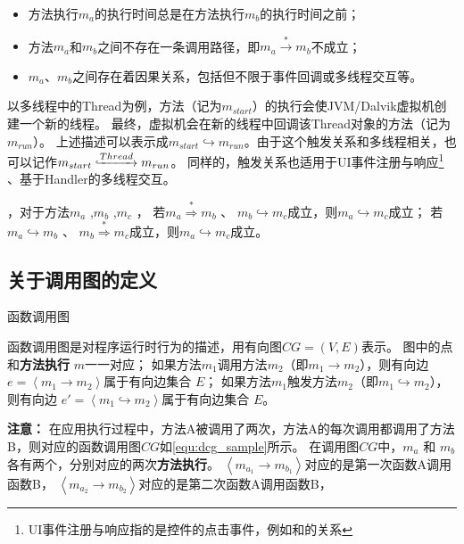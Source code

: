	\begin{itemize}
		\setlength{\itemsep}{-5pt}
		\item  方法执行$m_a$的执行时间总是在方法执行$m_b$的执行时间之前；
		\item 方法$m_a$和$m_b$之间不存在一条调用路径，即$m_a \stackrel{\ast}{\to} m_b $不成立；
		\item $m_a$、$m_b$之间存在着因果关系，包括但不限于事件回调或多线程交互等。
	\end{itemize}


以多线程中的Thread为例，方法（记为$m_{start}$）的执行会使JVM/Dalvik虚拟机创建一个新的线程。
最终，虚拟机会在新的线程中回调该Thread对象的方法（记为$m_{run}$）。
上述描述可以表示成$m_{start} \hookrightarrow m_{run}$。由于这个触发关系和多线程相关，也可以记作$m_{start} \lhook\joinrel\xrightarrow{Thread}  m_{run} $。
同样的，触发关系也适用于UI事件注册与响应\footnote{UI事件注册与响应指的是控件的点击事件，例如和的关系} 、基于Handler的多线程交互。

，对于方法$m_a$ ,$m_b$ ,$m_c$ ，
若$m_a  \stackrel{\ast}{ \Rightarrow } m_b$ 、 $m_b \hookrightarrow m_c$成立，则$m_a \hookrightarrow m_c$成立；
若$m_a  \hookrightarrow m_b$ 、 $m_b \stackrel{\ast}{ \Rightarrow }  m_c$成立，则$m_a \hookrightarrow m_c$成立。

\subsection{关于调用图的定义}

\begin{Def}
	函数调用图%
\end{Def}	


	函数调用图是对程序运行时行为的描述，用有向图$CG = ( V , E)$表示。 图中的点和\textbf{方法执行} $m$一一对应；
	如果方法$m_1$调用方法$m_2$（即$m_1 \to m_2$），则有向边 $e = \left\langle m_1  \to m_2 \right\rangle $属于有向边集合 $E$；
	如果方法$m_1$触发方法$m_2$（即$m_1 \hookrightarrow m_2$），则有向边 $e' = \left\langle m_1  \hookrightarrow m_2 \right\rangle $属于有向边集合 $E$。 


\textbf{注意：}
在应用执行过程中，方法A被调用了两次，方法A的每次调用都调用了方法B，则对应的函数调用图$CG$如\autoref{equ:dcg_sample}所示。
在调用图$CG$中，$m_a$ 和 $m_b$ 各有两个，分别对应的两次\textbf{方法执行}。
$\left\langle m_{a_{1}} \to m_{b_{1}}\right\rangle $对应的是第一次函数A调用函数B，
$\left\langle m_{a_{2}} \to m_{b_{2}} \right\rangle    $对应的是第二次函数A调用函数B，

